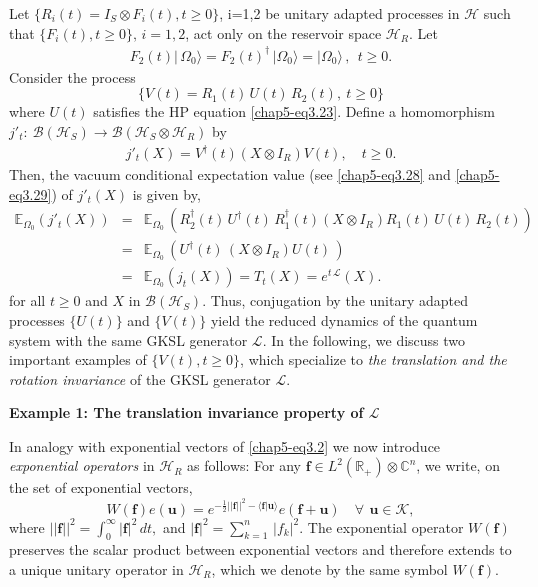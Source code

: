 Let $\{R_i(t)=I_S\otimes F_i(t), t\geq 0\}$, i=1,2  be unitary adapted processes in $\mathcal{H}$ such that  $\{F_i(t), t\geq 0\},\, i=1,2$, act only on the reservoir space $\mathcal{H}_R$. Let 
\begin{eqnarray}
F_2(t)\vert\, \Omega_0\rangle=F_2(t)^\dag\,\vert \Omega_0\rangle=\vert\Omega_0\rangle\, ,\ \ t\geq 0. \label{chap5-eq4.1}
\end{eqnarray}
Consider the process 
\begin{equation}
\{V(t)=R_1(t)\, U(t)\, R_2(t),\  t\geq 0\} \label{chap5-eq4.2}
\end{equation} 
where  $U(t)$ satisfies the HP equation \eqref{chap5-eq3.23}. Define a homomorphism $j'_t:  \ \mathcal{B}(\mathcal{H}_S)\longrightarrow \mathcal{B}(\mathcal{H}_S\otimes\mathcal{H}_R)$ by 
\begin{eqnarray}
j'_t (X) = V^{\dagger}(t) (X \otimes I_R)  V(t), \quad t \ge 0.   \label{chap5-eq4.3}
\end{eqnarray}
Then, the vacuum conditional expectation value (see \eqref{chap5-eq3.28} and \eqref{chap5-eq3.29}) of $j'_{t}(X)$ is given by, 
\begin{eqnarray}
\mathbb{E}_{\Omega_0} \left(j'_t(X)\right) &=& \mathbb{E}_{\Omega_0}\, \left(R^{\dagger}_2(t)\, U^\dag(t)\, R^\dag_1(t) (X \otimes I_R)  R_1(t)\, U(t)\, R_2(t)\right)\nonumber \\
&=& \mathbb{E}_{\Omega_0}\,\left( U^\dag(t)\,  (X \otimes I_R)  U(t)\, \right)\nonumber\\
&=&\mathbb{E}_{\Omega_0} \left(j_t(X)\right)=T_t(X) =e^{t\,\mathcal{L}}(X).   \label{chap5-eq4.4}
\end{eqnarray} 
for all $t\geq 0$ and $X$ in $\mathcal{B}(\mathcal{H}_S)$. Thus, conjugation by the unitary adapted processes $\{U(t)\}$ and $\{V(t)\}$ yield the reduced dynamics of the quantum system with  the same GKSL generator $\mathcal{L}$. 
In the following, we discuss two important examples of $\{V(t), t\geq 0\}$, which specialize to {\em the  translation  and the rotation invariance} of the GKSL generator $\mathcal{L}$. 

\medskip
\noindent \textbf{\large{Example 1:  The translation invariance property of $\mathcal{L}$}} 
\medskip

In analogy with exponential vectors of \eqref{chap5-eq3.2} we now introduce {\it exponential operators}  in $\mathcal{H}_R$ as follows:  For any $\mathbf{f}\in L^2(\mathbb{R}_+)\otimes \mathbb{C}^n$, we write, on the set of exponential vectors, 
\begin{equation}
W(\mathbf{f}) e(\mathbf{u}) = e^{-\frac{1}{2} ||\mathbf{f}||^{2} - \langle \mathbf{f}|\mathbf{u} \rangle} e (\mathbf{f}+\mathbf{u}) \quad \forall\, \ \mathbf{u}\in\mathcal{K},      \label{chap5-eq4.5}
\end{equation} 
where $\vert\vert\mathbf{f}\vert\vert^{2}=\int_0^{\infty} \vert \mathbf{f}\vert^2\, dt,$ and $\vert \mathbf{f}\vert^2= \sum_{k=1}^{n}\,\vert  f_k\vert^2$.  The exponential operator $W(\mathbf{f})$ preserves the scalar product between exponential vectors and therefore extends to a unique unitary operator in $\mathcal{H}_R$, which we denote by the same symbol $W(\mathbf{f})$. 


